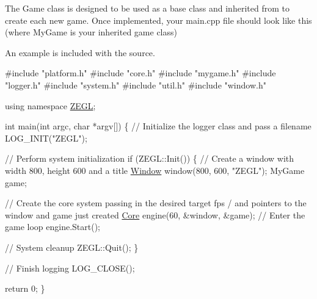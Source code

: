 The {\ttfamily Game} class is designed to be used as a base class and inherited from to create each new game. Once implemented, your main.\+cpp file should look like this (where {\ttfamily My\+Game} is your inherited game class)

An example is included with the source.


\begin{DoxyCode}
\textcolor{preprocessor}{#include "platform.h"}
\textcolor{preprocessor}{#include "core.h"}
\textcolor{preprocessor}{#include "mygame.h"}
\textcolor{preprocessor}{#include "logger.h"}
\textcolor{preprocessor}{#include "system.h"}
\textcolor{preprocessor}{#include "util.h"}
\textcolor{preprocessor}{#include "window.h"}

\textcolor{keyword}{using namespace }\hyperlink{namespace_z_e_g_l}{ZEGL};

\textcolor{keywordtype}{int} main(\textcolor{keywordtype}{int} argc, \textcolor{keywordtype}{char} *argv[])
\{
  \textcolor{comment}{// Initialize the logger class and pass a filename}
  LOG\_INIT(\textcolor{stringliteral}{"ZEGL"});

  \textcolor{comment}{// Perform system initialization}
  \textcolor{keywordflow}{if} (ZEGL::Init())
  \{
    \textcolor{comment}{// Create a window with width 800, height 600 and a title}
    \hyperlink{class_z_e_g_l_1_1_window}{Window} window(800, 600, \textcolor{stringliteral}{"ZEGL"});
    MyGame game;

    \textcolor{comment}{// Create the core system passing in the desired target fps}
    / and pointers to the window and game just created
    \hyperlink{class_z_e_g_l_1_1_core}{Core} engine(60, &window, &game);
    \textcolor{comment}{// Enter the game loop}
    engine.Start();

    \textcolor{comment}{// System cleanup}
    ZEGL::Quit();
  \}

  \textcolor{comment}{// Finish logging}
  LOG\_CLOSE();

  \textcolor{keywordflow}{return} 0;
\}
\end{DoxyCode}
 